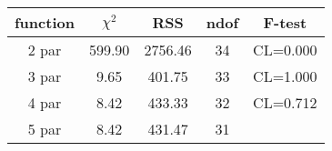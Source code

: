 \begin{tabular}{c|c|c|c|c}
function & $\chi^2$ & RSS & ndof & F-test \\
\hline
2 par & 599.90 & 2756.46 & 34 & CL=0.000 \\
3 par & 9.65 & 401.75 & 33 & CL=1.000 \\
4 par & 8.42 & 433.33 & 32 & CL=0.712 \\
5 par & 8.42 & 431.47 & 31 & \\
\hline
\end{tabular}